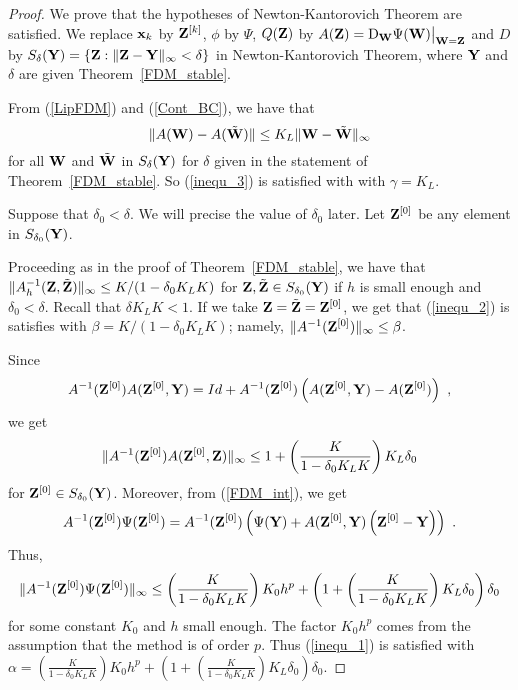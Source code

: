 \begin{proof}
We prove that the hypotheses of Newton-Kantorovich Theorem are
satisfied.  We replace $\mathbf{x}_k$ by $\mathbf{Z}^{[k]}$, $\phi$
by $\Psi$, $Q(\mathbf{Z})$ by $\displaystyle A(\mathbf{Z})
= \mathrm{D}_{\mathbf{W}} \Psi(\mathbf{W})\big|_{\mathbf{W} = \mathbf{Z}}$ and
$D$ by
$S_\delta(\mathbf{Y}) = \{ \mathbf{Z} : \|\mathbf{Z} - \mathbf{Y}\|_\infty < \delta \}$
in Newton-Kantorovich Theorem, where $\mathbf{Y}$ and $\delta$ are given
Theorem~\ref{FDM_stable}.

From (\ref{LipFDM}) and (\ref{Cont_BC}), we have that
\[
\| A(\mathbf{W}) - A(\tilde{\mathbf{W}}) \| \leq K_L
\| \mathbf{W} - \tilde{\mathbf{W}} \|_\infty
\]
for all $\mathbf{W}$ and $\tilde{\mathbf{W}}$ in $S_\delta(\mathbf{Y})$
for $\delta$ given in the statement of Theorem~\ref{FDM_stable}.
So (\ref{inequ_3}) is satisfied with with $\gamma = K_L$.

Suppose that $\delta_0 < \delta$.  We will precise the value of
$\delta_0$ later.  Let $\mathbf{Z}^{[0]}$ be any element in 
$S_{\delta_0}(\mathbf{Y})$.

Proceeding as in the proof of Theorem~\ref{FDM_stable}, we have that
$\| A_h^{-1}(\mathbf{Z},\tilde{\mathbf{Z}}) \|_\infty \leq K/(1-\delta_0 K_L K)$
for $\mathbf{Z} , \tilde{\mathbf{Z}} \in S_{\delta_0}(\mathbf{Y})$ if
$h$ is small enough and $\delta_0 < \delta$.  Recall that
$\delta K_L K < 1$.  If we take
$\mathbf{Z} = \tilde{\mathbf{Z}} = \mathbf{Z}^{[0]}$, we get that 
(\ref{inequ_2}) is satisfies with $\beta = K/(1-\delta_0 K_L K)$;
namely,  $\| A^{-1}(\mathbf{Z}^{[0]}) \|_\infty \leq \beta$.

Since
\[
A^{-1}(\mathbf{Z}^{[0]}) A(\mathbf{Z}^{[0]}, \mathbf{Y}) = Id
+ A^{-1}(\mathbf{Z}^{[0]}) \left( A(\mathbf{Z}^{[0]},\mathbf{Y})
- A(\mathbf{Z}^{[0]})\right) \ ,
\]
we get
\[
\| A^{-1}(\mathbf{Z}^{[0]}) A(\mathbf{Z}^{[0]},\mathbf{Z}) \|_\infty
\leq 1 + \left(\frac{K}{1-\delta_0 K_L K}\right) K_L \delta_0
\]
for $\mathbf{Z}^{[0]} \in S_{\delta_0}(\mathbf{Y})$.
Moreover, from (\ref{FDM_int}), we get
\[
A^{-1}(\mathbf{Z}^{[0]}) \Psi(\mathbf{Z}^{[0]}) =
A^{-1}(\mathbf{Z}^{[0]}) \left( \Psi(\mathbf{Y}) +
A(\mathbf{Z}^{[0]},\mathbf{Y}) \left( \mathbf{Z}^{[0]}
- \mathbf{Y} \right) \right) \ .
\]
Thus,
\[
\| A^{-1}(\mathbf{Z}^{[0]}) \Psi(\mathbf{Z}^{[0]}) \|_\infty
\leq \left(\frac{K}{1-\delta_0 K_L K}\right) K_0 h^p
+ \left( 1 + \left(\frac{K}{1-\delta_0 K_L K}\right) K_L\delta_0
\right) \delta_0
\]
for some constant $K_0$ and $h$ small enough.  The factor
$K_0h^p$ comes from the assumption that the method is of order $p$.
Thus (\ref{inequ_1}) is satisfied with 
$\displaystyle \alpha = \left(\frac{K}{1-\delta_0 K_L K} \right) K_0 h^p
+ \left( 1 + \left(\frac{K}{1-\delta_0 K_L K}\right)K_L\delta_0
\right) \delta_0$.


\end{proof}
